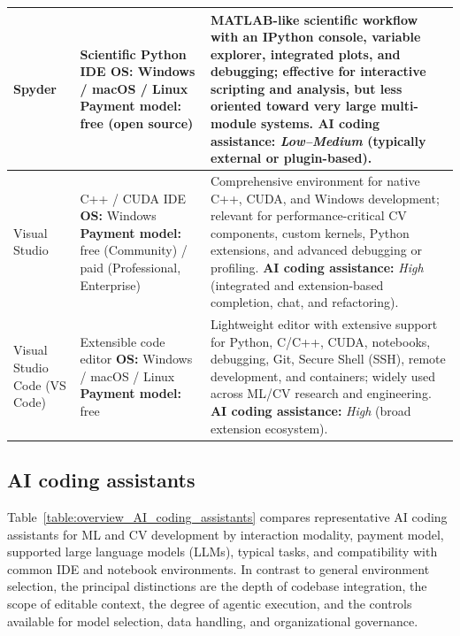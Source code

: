 \documentclass{article}
\newcounter{entry}[section]
\renewcommand{\theentry}{\thesection.\arabic{entry}}
\newcommand{\EntryRow}[5]{
    \noalign{
        \stepcounter{entry}
        \xdef\ENTRYNUM{\theentry}
        \phantomsection\label{entry:#1}
        \addcontentsline{toc}{subsubsection}{\ENTRYNUM\hspace{0.5cm}#2}
    }
    #2 #3 & #4 & #5 \\
    \hline
}
\begin{document}
\begin{longtable}{|p{}|p{}|p{}|}
    \EntryRow{spyder}{Spyder}{\cite{raybaut2009spyder}}{Scientific Python IDE \newline \textbf{OS:} Windows / macOS / Linux \newline \textbf{Payment model:} free (open source)}{MATLAB-like scientific workflow with an IPython console, variable explorer, integrated plots, and debugging; effective for interactive scripting and analysis, but less oriented toward very large multi-module systems. \newline \textbf{AI coding assistance:} \textit{Low--Medium} (typically external or plugin-based).}

    \EntryRow{visual_studio}{Visual Studio}{\cite{amann2016study}}{C++ / CUDA IDE \newline \textbf{OS:} Windows \newline \textbf{Payment model:} free (Community) / paid (Professional, Enterprise)}{Comprehensive environment for native C++, CUDA, and Windows development; relevant for performance-critical CV components, custom kernels, Python extensions, and advanced debugging or profiling. \newline \textbf{AI coding assistance:} \textit{High} (integrated and extension-based completion, chat, and refactoring).}

    \EntryRow{visual_studio_code}{Visual Studio Code (VS Code)}{\cite{tan2023visual}}{Extensible code editor \newline \textbf{OS:} Windows / macOS / Linux \newline \textbf{Payment model:} free}{Lightweight editor with extensive support for Python, C/C++, CUDA, notebooks, debugging, Git, Secure Shell (SSH), remote development, and containers; widely used across ML/CV research and engineering. \newline \textbf{AI coding assistance:} \textit{High} (broad extension ecosystem).}
\end{longtable}




\clearpage




\subsection{AI coding assistants}

Table~\ref{table:overview_AI_coding_assistants} compares representative AI coding assistants for ML and CV development by interaction modality, payment model, supported large language models (LLMs), typical tasks, and compatibility with common IDE and notebook environments. In contrast to general environment selection, the principal distinctions are the depth of codebase integration, the scope of editable context, the degree of agentic execution, and the controls available for model selection, data handling, and organizational governance.
\end{document}
